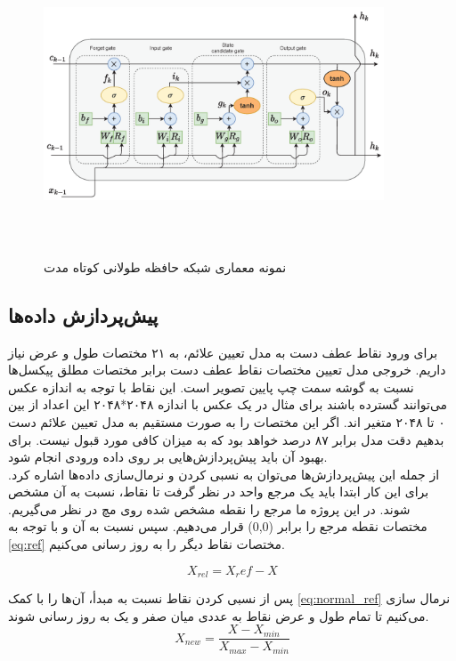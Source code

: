 \begin{figure}[h]
    \centering
    \includegraphics[height=9cm,width=0.9\textwidth]{LSTM.png}
    \caption[نمونه معماری شبکه‌ حافظه طولانی کوتاه مدت]{نمونه معماری شبکه‌ حافظه طولانی کوتاه مدت \cite{s21165625}}
\end{figure}




\subsection{پیش‌پردازش داده‌ها}
برای ورود نقاط عطف دست به مدل تعیین علائم، به ۲۱ مختصات طول و عرض نیاز داریم. خروجی مدل تعیین مختصات نقاط عطف دست برابر مختصات مطلق پیکسل‌ها نسبت به گوشه سمت 
چپ پایین تصویر است. این نقاط با توجه به اندازه عکس می‌توانند گسترده باشند برای مثال در یک عکس با اندازه ۲۰۴۸*۲۰۴۸ این اعداد از بین ۰ تا ۲۰۴۸ متغیر اند. 
اگر این مختصات را به صورت مستقیم به مدل تعیین علائم دست بدهیم دقت مدل برابر ۸۷ درصد خواهد بود که به میزان کافی مورد قبول نیست. برای بهبود آن باید پیش‌پردازش‌هایی بر روی داده ورودی انجام شود. 
\\
از جمله این پیش‌پردازش‌ها می‌توان به نسبی کردن و نرمال‌سازی داده‌ها اشاره کرد. برای این کار ابتدا باید یک مرجع واحد در نظر گرفت تا نقاط، نسبت به آن مشخص شوند. در این پروژه ما مرجع را نقطه 
مشخص شده روی مچ در نظر می‌گیریم. مختصات نقطه مرجع را برابر (0,0)  قرار می‌دهیم. سپس نسبت به آن و با توجه به
\cref{eq:ref}
مختصات نقاط دیگر را به روز رسانی می‌کنیم.

\begin{equation}\label{eq:ref}
    X_{rel} = X_ref -X
\end{equation}


پس از نسبی کردن نقاط نسبت به مبدأ، آن‌ها را با کمک 
\cref{eq:normal_ref}
نرمال سازی می‌کنیم تا تمام طول و عرض نقاط به عددی میان صفر و یک به روز رسانی شوند.
\begin{equation}\label{eq:normal_ref}
    X_{new} = \frac{X - X_{min}}{X_{max} - X_{min}}
\end{equation}

